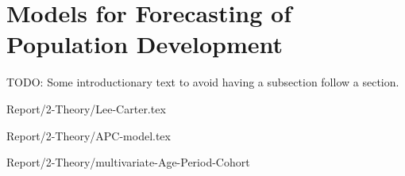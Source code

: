\newpage
\section{Models for Forecasting of Population Development}
\label{sec:ModelsPopulationDevelopment}

\textcolor{myDarkGreen}{TODO: Some introductionary text to avoid having a subsection follow a section. }

{Report/2-Theory/Lee-Carter.tex}

{Report/2-Theory/APC-model.tex}

{Report/2-Theory/multivariate-Age-Period-Cohort}